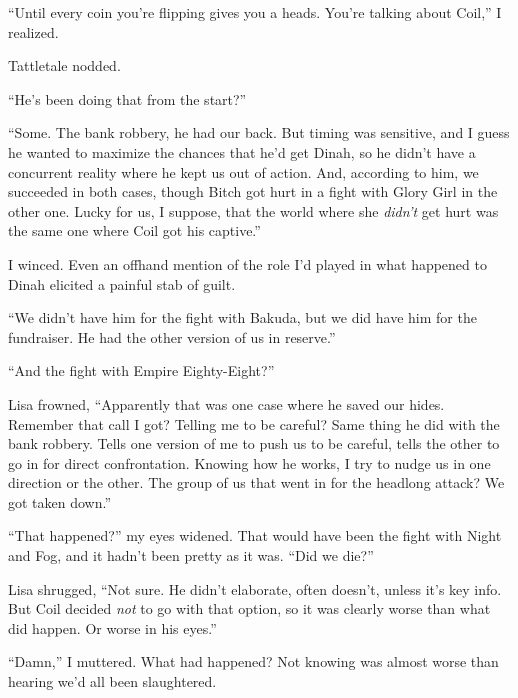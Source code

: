 ``Until every coin you're flipping gives you a heads.  You're talking about Coil,'' I realized.



Tattletale nodded.



``He's been doing that from the start?''



``Some.  The bank robbery, he had our back.  But timing was sensitive, and I guess he wanted to maximize the chances that he'd get Dinah, so he didn't have a concurrent reality where he kept us out of action.  And, according to him, we succeeded in both cases, though Bitch got hurt in a fight with Glory Girl in the other one.  Lucky for us, I suppose, that the world where she \emph{didn't} get hurt was the same one where Coil got his captive.''



I winced.  Even an offhand mention of the role I'd played in what happened to Dinah elicited a painful stab of guilt.



``We didn't have him for the fight with Bakuda, but we did have him for the fundraiser.  He had the other version of us in reserve.''



``And the fight with Empire Eighty-Eight?''



Lisa frowned, ``Apparently that was one case where he saved our hides.  Remember that call I got?  Telling me to be careful?  Same thing he did with the bank robbery.  Tells one version of me to push us to be careful, tells the other to go in for direct confrontation.  Knowing how he works, I try to nudge us in one direction or the other.  The group of us that went in for the headlong attack?  We got taken down.''



``That happened?'' my eyes widened.  That would have been the fight with Night and Fog, and it hadn't been pretty as it was.  ``Did we die?''



Lisa shrugged, ``Not sure.  He didn't elaborate, often doesn't, unless it's key info.  But Coil decided \emph{not} to go with that option, so it was clearly worse than what did happen.  Or worse in his eyes.''



``Damn,'' I muttered.  What had happened?  Not knowing was almost worse than hearing we'd all been slaughtered.



